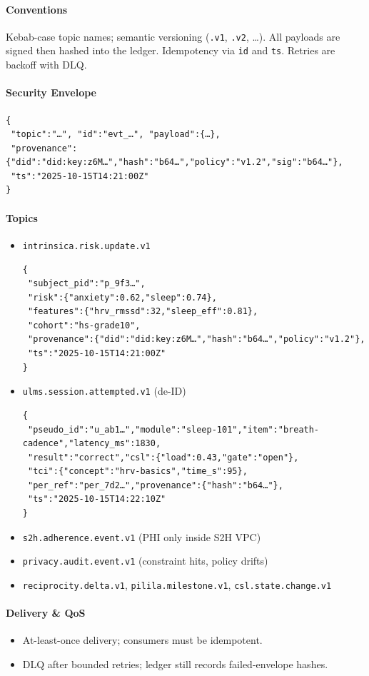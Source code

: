 \documentclass[11pt]{article}
\theoremstyle{plain}
\begin{document}
\paragraph{Conventions}
Kebab-case topic names; semantic versioning (\texttt{.v1}, \texttt{.v2}, \dots). All payloads are signed then hashed into the ledger. Idempotency via \texttt{id} and \texttt{ts}. Retries are backoff with DLQ.

\paragraph{Security Envelope}
\begin{verbatim}
{
 "topic":"…", "id":"evt_…", "payload":{…},
 "provenance":{"did":"did:key:z6M…","hash":"b64…","policy":"v1.2","sig":"b64…"},
 "ts":"2025-10-15T14:21:00Z"
}
\end{verbatim}

\paragraph{Topics}
\begin{itemize}
  \item \texttt{intrinsica.risk.update.v1}
\begin{verbatim}
{
 "subject_pid":"p_9f3…",
 "risk":{"anxiety":0.62,"sleep":0.74},
 "features":{"hrv_rmssd":32,"sleep_eff":0.81},
 "cohort":"hs-grade10",
 "provenance":{"did":"did:key:z6M…","hash":"b64…","policy":"v1.2"},
 "ts":"2025-10-15T14:21:00Z"
}
\end{verbatim}
  \item \texttt{ulms.session.attempted.v1} (de-ID)
\begin{verbatim}
{
 "pseudo_id":"u_ab1…","module":"sleep-101","item":"breath-cadence","latency_ms":1830,
 "result":"correct","csl":{"load":0.43,"gate":"open"},
 "tci":{"concept":"hrv-basics","time_s":95},
 "per_ref":"per_7d2…","provenance":{"hash":"b64…"},
 "ts":"2025-10-15T14:22:10Z"
}
\end{verbatim}
  \item \texttt{s2h.adherence.event.v1} (PHI only inside S2H VPC)
  \item \texttt{privacy.audit.event.v1} (constraint hits, policy drifts)
  \item \texttt{reciprocity.delta.v1}, \texttt{pilila.milestone.v1}, \texttt{csl.state.change.v1}
\end{itemize}

\paragraph{Delivery \& QoS}
\begin{itemize}
  \item At-least-once delivery; consumers must be idempotent.
  \item DLQ after bounded retries; ledger still records failed-envelope hashes.
\end{itemize}
\end{document}
